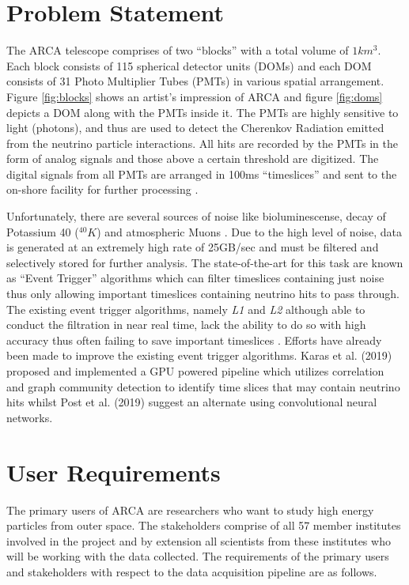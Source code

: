\section{Problem Statement}
\label{sec:soc}

The ARCA telescope comprises of two ``blocks'' with a total volume of
$1km^{3}$. Each block consists of 115 spherical detector units (DOMs)
and each DOM consists of 31 Photo Multiplier Tubes (PMTs) in various
spatial arrangement. Figure \ref{fig:blocks} shows an artist's
impression of ARCA and figure \ref{fig:doms} depicts a DOM along with
the PMTs inside it. The PMTs are highly sensitive to light (photons),
and thus are used to detect the Cherenkov Radiation emitted from the
neutrino particle interactions. All hits are recorded by the PMTs in
the form of analog signals and those above a certain threshold are
digitized. The digital signals from all PMTs are arranged in 100ms
``timeslices'' and sent to the on-shore facility for further
processing \cite{aiello2019km3net}.

Unfortunately, there are several sources of noise like
bioluminescense, decay of Potassium 40 ($^{40}K$) and atmospheric
Muons \cite{post2019km3nnet}. Due to the high level of noise, data is
generated at an extremely high rate of 25GB/sec
\cite{adrian2016letter} and must be filtered and selectively stored
for further analysis. The state-of-the-art for this task are known as
``Event Trigger'' algorithms \cite{adrian2016letter,aiello2019km3net}
which can filter timeslices containing just noise thus only allowing
important timeslices containing neutrino hits to pass through. The
existing event trigger algorithms, namely \emph{L1} and \emph{L2}
although able to conduct the filtration in near real time, lack the
ability to do so with high accuracy thus often failing to save
important timeslices \cite{karas2019data}. Efforts have already been
made to improve the existing event trigger algorithms. Karas et al.
(2019) proposed and implemented a GPU powered pipeline which utilizes
correlation and graph community detection to identify time slices that
may contain neutrino hits whilst Post et al. (2019) suggest an
alternate using convolutional neural networks.

\section{User Requirements}
\label{sec:user-req}

The primary users of ARCA are researchers who want to study high
energy particles from outer space. The stakeholders comprise of all 57
member institutes involved in the project and by extension all
scientists from these institutes who will be working with the data
collected. The requirements of the primary users and stakeholders with
respect to the data acquisition pipeline are as follows.


